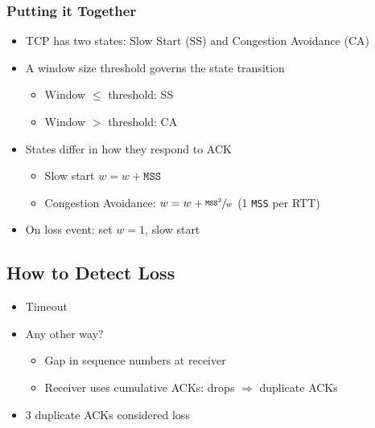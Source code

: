 \subsubsection{Putting it Together}
\begin{itemize}[nosep]
    \item TCP has two states: Slow Start (SS) and Congestion Avoidance (CA)
    \item A window size threshold governs the state transition
          \begin{itemize}[nosep]
              \item Window $\leq$ threshold: SS
              \item Window $>$ threshold: CA
          \end{itemize}
    \item States differ in how they respond to ACK
          \begin{itemize}[nosep]
              \item Slow start $w = w + \texttt{MSS}$
              \item Congestion Avoidance: $w = w + \sfrac{\texttt{MSS}^2}{w}$ (1 \texttt{MSS} per RTT)
          \end{itemize}
    \item On loss event: set $w = 1$, slow start
\end{itemize}

\subsection{How to Detect Loss}
\begin{itemize}[nosep]
    \item Timeout
    \item Any other way?
          \begin{itemize}[nosep]
              \item Gap in sequence numbers at receiver
              \item Receiver uses cumulative ACKs: drops $\Rightarrow$ duplicate ACKs
          \end{itemize}
    \item 3 duplicate ACKs considered loss
\end{itemize}

